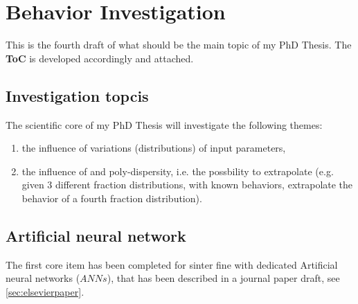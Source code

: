 
\section{Behavior Investigation}
\label{section:behaviorinvestigation}

This is the fourth draft of what should be the main topic of my PhD Thesis. 
The \textbf{ToC} is developed accordingly and attached.

\subsection{Investigation topcis}
\label{subsection:investigationtopics}

The scientific core of my PhD Thesis will investigate the following themes:
\begin{enumerate}
\item{the influence of variations (distributions) of input parameters,}
\item{the influence of and poly-dispersity, i.e. the possbility to extrapolate
(e.g. given 3 different fraction distributions, with known behaviors, extrapolate 
the behavior of a fourth fraction distribution).}
\end{enumerate}

\subsection{Artificial neural network}
\label{subsection:artificialneuralnetwork}

The first core item has been completed for sinter fine with dedicated Artificial
neural networks ($ANNs$), that has been described in a journal paper draft, see
\ref{sec:elsevierpaper}.\\